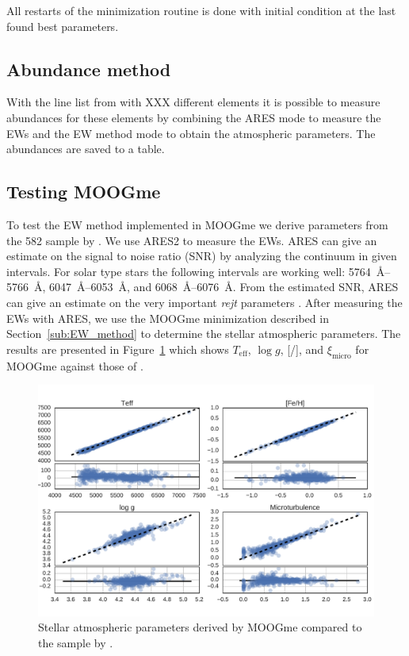 \documentclass{aa}
\begin{document}
All restarts of the minimization routine is done with initial condition at
the last found best parameters.


\subsection{Abundance method}
\label{sub:Abundance_method}

With the line list from \citet{Adibekyan...} with XXX different elements
it is possible to measure abundances for these elements by combining the
ARES mode to measure the EWs and the EW method mode to obtain the atmospheric
parameters. The abundances are saved to a table.


\subsection{Testing MOOGme}
\label{sub:Testing_MOOGme}
To test the EW method implemented in MOOGme we derive
parameters from the 582 sample by \citet{Sousa2011}. We use ARES2
to measure the EWs. ARES can give an estimate on the signal to
noise ratio (SNR) by analyzing the continuum in given intervals.
For solar type stars the following intervals are working well:
\SIrange{5764}{5766}{\angstrom}, \SIrange{6047}{6053}{\angstrom}, and
\SIrange{6068}{6076}{\angstrom}. From the estimated SNR, ARES can give
an estimate on the very important \emph{rejt} parameters
\citep[see][for more information]{Sousa2015a}. After measuring the EWs
with ARES, we use the MOOGme minimization described in
Section~\ref{sub:EW_method} to determine the stellar atmospheric parameters.
The results are presented in Figure~\ref{fig:MOOGmeTest} which shows
$T_\mathrm{eff}$, $\log g$, [/], and $\xi_\mathrm{micro}$
for MOOGme against those of \citet{Sousa2011}.

\begin{figure}[tpb]
    \centering
    \includegraphics[width=1.0\linewidth]{figures/MOOGmeTest.pdf}
    \caption{Stellar atmospheric parameters derived by MOOGme compared
    to the sample by \citet{Sousa2011}.}
    \label{fig:MOOGmeTest}
\end{figure}
\end{document}
